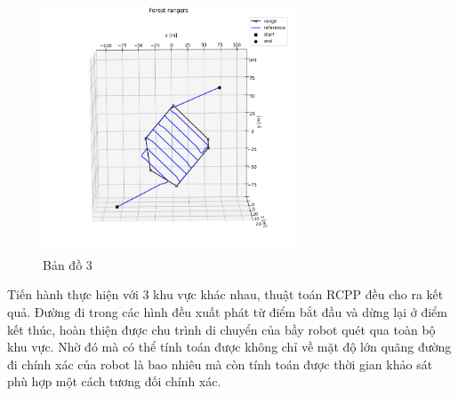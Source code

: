 \begin{figure}[h!]
    \centering
    \includegraphics[width=0.68\textwidth]{chapter5/image/anh3_op.png}
    \caption{Bản đồ 3}
    \label{fig:o3}
\end{figure}

Tiến hành thực hiện với 3 khu vực khác nhau, thuật toán RCPP đều cho ra kết quả. Đường đi trong các hình đều xuất phát từ điểm bắt đầu và dừng lại ở điểm kết thúc, hoàn thiện được chu trình di chuyển của bầy robot quét qua toàn bộ khu vực. Nhờ đó mà có thể tính toán được không chỉ về mặt độ lớn quãng đường đi chính xác của robot là bao nhiêu mà còn tính toán được thời gian khảo sát phù hợp một cách tương đối chính xác.


